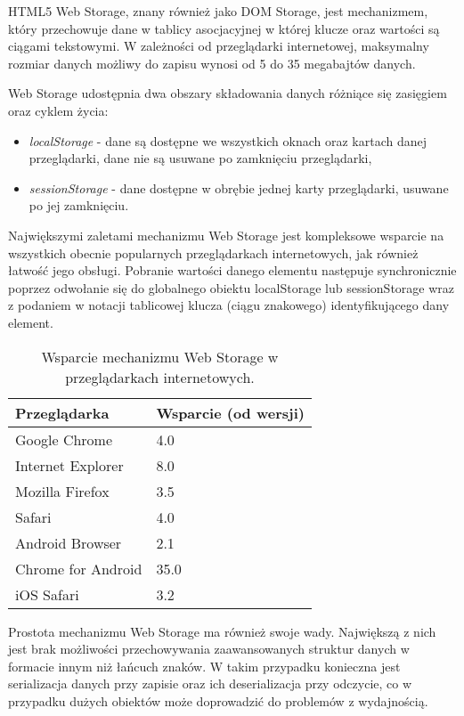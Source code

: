 HTML5 Web Storage\cite{webStorage}, znany również jako DOM Storage, jest mechanizmem, który przechowuje dane w tablicy asocjacyjnej w której klucze oraz wartości są ciągami tekstowymi. W zależności od przeglądarki internetowej, maksymalny rozmiar danych możliwy do zapisu wynosi od 5 do 35 megabajtów danych.

Web Storage udostępnia dwa obszary składowania danych różniące się zasięgiem oraz cyklem życia:

\begin{itemize}
\item \emph{localStorage} - dane są dostępne we wszystkich oknach oraz kartach danej przeglądarki, dane nie są usuwane po zamknięciu przeglądarki,
\item \emph{sessionStorage} - dane dostępne w obrębie jednej karty przeglądarki, usuwane po jej zamknięciu.
\end{itemize}

Największymi zaletami mechanizmu Web Storage jest kompleksowe wsparcie na wszystkich obecnie popularnych przeglądarkach internetowych, jak również łatwość jego obsługi. Pobranie wartości danego elementu następuje synchronicznie poprzez odwołanie się do globalnego obiektu localStorage lub sessionStorage wraz z podaniem w notacji tablicowej klucza (ciągu znakowego) identyfikującego dany element.

\begin{table}[h]
\centering
    \begin{tabular}{ | p{8cm} | p{6cm} | }
    \hline
    \textbf{Przeglądarka} & \textbf{Wsparcie (od wersji)} \\ \hline
	Google Chrome & 4.0
	\\ \hline
	Internet Explorer & 8.0
	\\ \hline
	Mozilla Firefox & 3.5
	\\ \hline
	Safari & 4.0
	\\ \hline
	Android Browser & 2.1
	\\ \hline
	Chrome for Android & 35.0
	\\ \hline
	iOS Safari & 3.2
	\\ \hline
    \end{tabular}
	\caption{Wsparcie mechanizmu Web Storage w przeglądarkach internetowych.}
\end{table}

Prostota mechanizmu Web Storage ma również swoje wady. Największą z nich jest brak możliwości przechowywania zaawansowanych struktur danych w formacie innym niż łańcuch znaków. W takim przypadku konieczna jest serializacja danych przy zapisie oraz ich deserializacja przy odczycie, co w przypadku dużych obiektów może doprowadzić do problemów z wydajnością.

